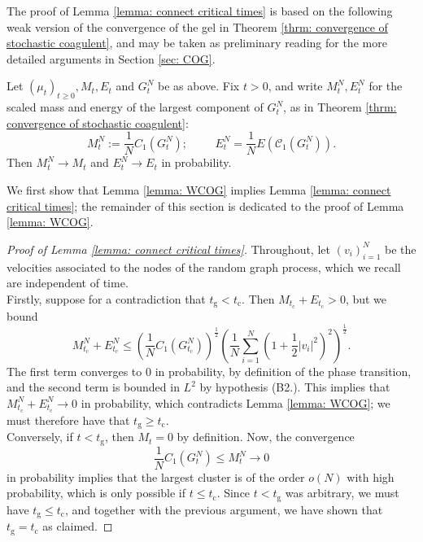 The proof of Lemma \ref{lemma: connect critical times} is based on the following weak version of the convergence of the gel in Theorem \ref{thrm: convergence of stochastic coagulent}, and may be taken as preliminary reading for the more detailed arguments in Section \ref{sec: COG}.
\begin{lemma} \label{lemma: WCOG} Let $(\mu_t)_{t\ge 0}, M_t, E_t$ and $G^N_t$ be as above. Fix $t>0$, and write $M^N_t, E^N_t$ for the scaled mass and energy of the largest component of $G^N_t$, as in Theorem \ref{thrm: convergence of stochastic coagulent}: \begin{equation} M^N_t:=\frac{1}{N}C_1(G^N_t); \hspace{1cm} E^N_t=\frac{1}{N}E(\mathcal{C}_1(G^N_t)). \end{equation} Then $M^N_t \rightarrow M_t$ and $E^N_t\rightarrow E_t$ in probability.
\end{lemma}
We first show that Lemma \ref{lemma: WCOG} implies Lemma \ref{lemma: connect critical times}; the remainder of this section is dedicated to the proof of Lemma \ref{lemma: WCOG}.
\begin{proof}[Proof of Lemma \ref{lemma: connect critical times}] Throughout, let $(v_i)_{i=1}^N$ be the velocities associated to the nodes of the random graph process, which we recall are independent of time. \medskip \\Firstly, suppose for a contradiction that $t_\mathrm{g}< t_\mathrm{c}$. Then $M_{t_\mathrm{c}}+E_{t_\mathrm{c}}>0$, but we bound \begin{equation}\label{eq: use of CS 0} M^N_{t_\mathrm{c}}+E^N_{t_\mathrm{c}} \le \left(\frac{1}{N}C_1(G^N_{t_\mathrm{c}})\right)^\frac{1}{2}\left(\frac{1}{N}\sum_{i=1}^N(1+\frac{1}{2}|v_i|^2)^2\right)^\frac{1}{2}.\end{equation} The first term converges to $0$ in probability, by definition of the phase transition, and the second term is bounded in $L^2$ by hypothesis (B2.). This implies that $M^N_{t_\mathrm{c}}+E^N_{t_\mathrm{c}}\rightarrow 0$ in probability, which contradicts Lemma \ref{lemma: WCOG}; we must therefore have that $t_\mathrm{g}\ge t_\mathrm{c}.$ \medskip \\ Conversely, if $t< t_\mathrm{g}$, then $M_t=0$ by definition. Now, the convergence \begin{equation} \frac{1}{N}C_1(G^N_t) \le M^N_t\rightarrow 0\end{equation} in probability implies that the largest cluster is of the order $o(N)$ with high probability, which is only possible if $t\le t_\mathrm{c}$. Since $t<t_\mathrm{g}$ was arbitrary, we must have $t_\mathrm{g}\le t_\mathrm{c}$, and together with the previous argument, we have shown that $t_\mathrm{g}=t_\mathrm{c}$ as claimed.  \end{proof} 
